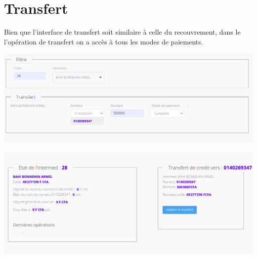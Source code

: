 	\section{Transfert}
		Bien que l'interface de transfert soit similaire à celle du recouvrement, dans le l'opération de transfert on a accès à tous les modes de paiements.
		\begin{center}
			\includegraphics[scale=0.4]{chap_3/transfert_1.png}
			\label{transfert_1}
		\end{center}
		\begin{center}
			\includegraphics[scale=0.4]{chap_3/transfert_2.png}
			\label{transfert_2}
		\end{center}
